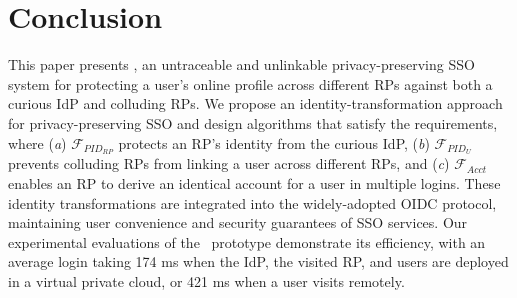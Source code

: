 \section{Conclusion}
\label{sec:conclusion}
This paper presents \usso, an untraceable and unlinkable privacy-preserving SSO system for protecting a user's online profile across different RPs against both a curious IdP and colluding RPs.
We propose an identity-transformation approach for privacy-preserving SSO and design algorithms that satisfy the requirements, where (\emph{a}) $\mathcal{F}_{PID_{RP}}$ protects an RP's identity from the curious IdP, (\emph{b}) $\mathcal{F}_{PID_{U}}$ prevents colluding RPs from linking a user across different RPs, and (\emph{c}) $\mathcal{F}_{Acct}$ enables an RP to derive an identical account for a user in multiple logins. These identity transformations are integrated into the widely-adopted OIDC protocol, maintaining user convenience and security guarantees of SSO services. Our experimental evaluations of the \usso\ prototype demonstrate its efficiency, with an average login taking 174 ms when the IdP, the visited RP, and users are deployed in a virtual private cloud, or 421 ms when a user visits remotely.

